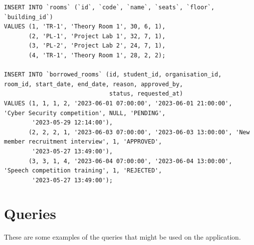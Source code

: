 \documentclass[12pt,titlepage]{article}
\begin{document}
\begin{verbatim}
INSERT INTO `rooms` (`id`, `code`, `name`, `seats`, `floor`, `building_id`)
VALUES (1, 'TR-1', 'Theory Room 1', 30, 6, 1),
       (2, 'PL-1', 'Project Lab 1', 32, 7, 1),
       (3, 'PL-2', 'Project Lab 2', 24, 7, 1),
       (4, 'TR-1', 'Theory Room 1', 28, 2, 2);

INSERT INTO `borrowed_rooms` (id, student_id, organisation_id, room_id, start_date, end_date, reason, approved_by,
                              status, requested_at)
VALUES (1, 1, 1, 2, '2023-06-01 07:00:00', '2023-06-01 21:00:00', 'Cyber Security competition', NULL, 'PENDING',
        '2023-05-29 12:14:00'),
       (2, 2, 2, 1, '2023-06-03 07:00:00', '2023-06-03 13:00:00', 'New member recruitment interview', 1, 'APPROVED',
        '2023-05-27 13:49:00'),
       (3, 3, 1, 4, '2023-06-04 07:00:00', '2023-06-04 13:00:00', 'Speech competition training', 1, 'REJECTED',
        '2023-05-27 13:49:00');
\end{verbatim}

\pagebreak

\section{Queries}
These are some examples of the queries that might be used on the application.
\end{document}
